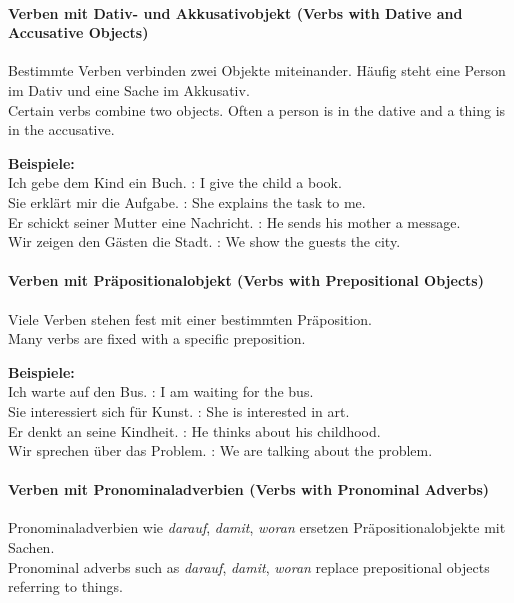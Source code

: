 \documentclass[a4paper]{article}
\begin{document}
    \paragraph{Verben mit Dativ- und Akkusativobjekt {\small (Verbs with Dative and Accusative Objects)}}
        Bestimmte Verben verbinden zwei Objekte miteinander. Häufig steht eine Person im Dativ und eine Sache im Akkusativ.\\
        Certain verbs combine two objects. Often a person is in the dative and a thing is in the accusative.
        
        \textbf{Beispiele:}\\
        Ich gebe dem Kind ein Buch. : I give the child a book.\\
        Sie erklärt mir die Aufgabe. : She explains the task to me.\\
        Er schickt seiner Mutter eine Nachricht. : He sends his mother a message.\\
        Wir zeigen den Gästen die Stadt. : We show the guests the city.
    
    \paragraph{Verben mit Präpositionalobjekt {\small (Verbs with Prepositional Objects)}}
        Viele Verben stehen fest mit einer bestimmten Präposition.\\
        Many verbs are fixed with a specific preposition.
        
        \textbf{Beispiele:}\\
        Ich warte auf den Bus. : I am waiting for the bus.\\
        Sie interessiert sich für Kunst. : She is interested in art.\\
        Er denkt an seine Kindheit. : He thinks about his childhood.\\
        Wir sprechen über das Problem. : We are talking about the problem.
    
    \paragraph{Verben mit Pronominaladverbien {\small (Verbs with Pronominal Adverbs)}}
        Pronominaladverbien wie \textit{darauf}, \textit{damit}, \textit{woran} ersetzen Präpositionalobjekte mit Sachen.\\
        Pronominal adverbs such as \textit{darauf}, \textit{damit}, \textit{woran} replace prepositional objects referring to things.
        
\end{document}
